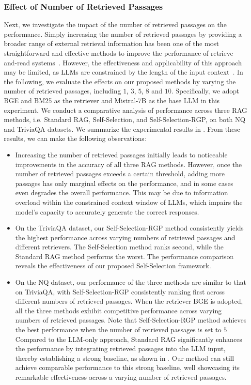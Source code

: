 \subsubsection{\textbf{Effect of Number of Retrieved Passages}}
Next, we investigate the impact of the number of retrieved passages on the performance.
Simply increasing the number of retrieved passages by providing a broader range of external retrieval information has been one of the most straightforward and effective methods to improve the performance of retrieve-and-read systems~\cite{karpukhin-etal-2020-dense}. 
However, the effectiveness and applicability of this approach may be limited, as LLMs are constrained by the length of the input context~\cite{liu-etal-2024-lost}.
In the following, we evaluate the effects on our proposed methods by varying the number of retrieved passages, including $1$, $3$, $5$, $8$ and $10$.
Specifically, we adopt BGE and BM25 as the retriever and Mistral-7B as the base LLM in this experiment. 
We conduct a comparative analysis of performance across three RAG methods, i.e. Standard RAG, Self-Selection, and Self-Selection-RGP, on both NQ and TriviaQA datasets.
We summarize the experimental results in .
From these results, we can make the following observations:
\begin{itemize}[leftmargin=*,nosep]
    \item Increasing the number of retrieved passages initially leads to noticeable improvements in the accuracy of all three RAG methods. However, once the number of retrieved passages exceeds a certain threshold, adding more passages has only marginal effects on the performance, and in some cases even degrades the overall performance.
    This may be due to information overload within the constrained context window of LLMs, which impairs the model’s capacity to accurately generate the correct responses.
    \item On the TriviaQA dataset, our Self-Selection-RGP method consistently yields the highest performance across varying numbers of retrieved passages and different retrievers. The Self-Selection method ranks second, while the Standard RAG method performs the worst.
    The performance comparison reveals the effectiveness of our proposed Self-Selection framework.
    \item On the NQ dataset, our performance of the three methods are similar to that on TriviaQA, with Self-Selection-RGP consistently ranking first across different numbers of retrieved passages.
    When the retriever BGE is adopted, all the three methods exhibit competitive performance across varying numbers of retrieved passages. 
    Note that Self-Selection-RGP method achieves the best performance when the number of retrieved passages is set to $5$
    Compared to the LLM-only approach, Standard RAG significantly enhances the performance by integrating retrieved passages into the LLM input, thereby establishing a strong baseline, as shown in . 
    Our method can still achieve comparable performance to this strong baseline, well showcasing its remarkable effectiveness across a varying number of retrieved passages.
\end{itemize}
 
